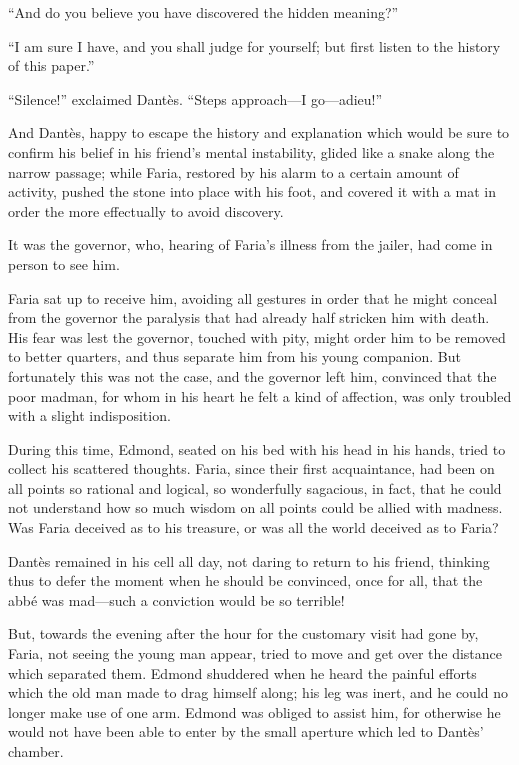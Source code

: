 “And do you believe you have discovered the hidden meaning?”

“I am sure I have, and you shall judge for yourself; but first listen
to the history of this paper.”

“Silence!” exclaimed Dantès. “Steps approach—I go—adieu!”

And Dantès, happy to escape the history and explanation which would be
sure to confirm his belief in his friend’s mental instability, glided
like a snake along the narrow passage; while Faria, restored by his
alarm to a certain amount of activity, pushed the stone into place with
his foot, and covered it with a mat in order the more effectually to
avoid discovery.

It was the governor, who, hearing of Faria’s illness from the jailer,
had come in person to see him.

Faria sat up to receive him, avoiding all gestures in order that he
might conceal from the governor the paralysis that had already half
stricken him with death. His fear was lest the governor, touched with
pity, might order him to be removed to better quarters, and thus
separate him from his young companion. But fortunately this was not the
case, and the governor left him, convinced that the poor madman, for
whom in his heart he felt a kind of affection, was only troubled with a
slight indisposition.

During this time, Edmond, seated on his bed with his head in his hands,
tried to collect his scattered thoughts. Faria, since their first
acquaintance, had been on all points so rational and logical, so
wonderfully sagacious, in fact, that he could not understand how so
much wisdom on all points could be allied with madness. Was Faria
deceived as to his treasure, or was all the world deceived as to Faria?

Dantès remained in his cell all day, not daring to return to his
friend, thinking thus to defer the moment when he should be convinced,
once for all, that the abbé was mad—such a conviction would be so
terrible!

But, towards the evening after the hour for the customary visit had
gone by, Faria, not seeing the young man appear, tried to move and get
over the distance which separated them. Edmond shuddered when he heard
the painful efforts which the old man made to drag himself along; his
leg was inert, and he could no longer make use of one arm. Edmond was
obliged to assist him, for otherwise he would not have been able to
enter by the small aperture which led to Dantès’ chamber.

